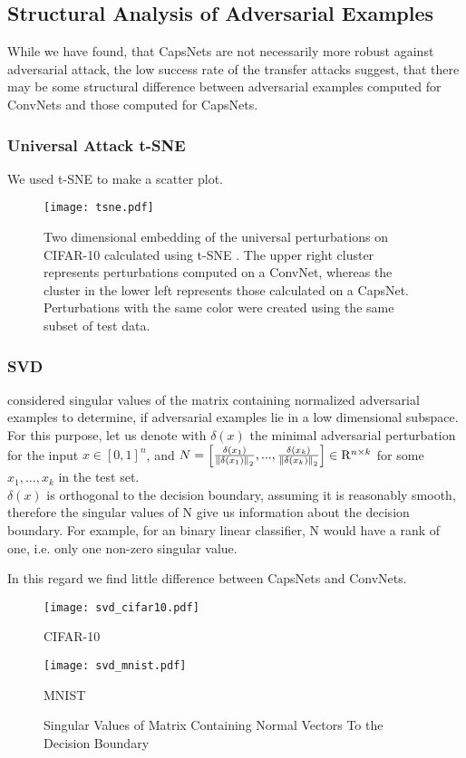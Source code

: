\subsection{Structural Analysis of Adversarial Examples}

While we have found, that CapsNets are not necessarily more robust against adversarial attack, the low success rate of the transfer attacks suggest, that there may be some structural difference between adversarial examples computed for ConvNets and those computed for CapsNets.

\subsubsection{Universal Attack t-SNE}

We used t-SNE \citep{tsne} to make a scatter plot.
\begin{figure}
	\texttt{[image: tsne.pdf]}
	\label{fig:tsne}
	\caption[t-SNE Plot of Universal Perturbations]{Two dimensional embedding of the universal perturbations on CIFAR-10 calculated using t-SNE \citep{tsne}. The upper right cluster represents perturbations computed on a ConvNet, whereas the cluster in the lower left represents those calculated on a CapsNet. Perturbations with the same color were created using the same subset of test data.}
\end{figure}




\subsubsection{SVD}
\citet{universal} considered singular values of the matrix containing normalized adversarial examples to determine, if adversarial examples lie in a low dimensional subspace. \\
For this purpose, let us denote with $\delta(x)$ the minimal adversarial perturbation for the input $x \in [0,1]^n$,
and $ N = \begin{bmatrix}
\frac{\delta(x_1)} {\left \lVert \delta(x_1) \right \rVert _2},  ...,  \frac{\delta(x_k)} {\left \lVert \delta(x_k) \right \rVert _2} 
\end{bmatrix}
\in \mathrm{R}^{n \times k}
$ for some $x_1, ..., x_k$ in the test set. \\
$\delta(x)$ is orthogonal to the decision boundary, assuming it is reasonably smooth, therefore the singular values of N give us information about the decision boundary. For example, for an binary linear classifier, N would have a rank of one, i.e. only one non-zero singular value.

In this regard we find little difference between CapsNets and ConvNets.

\begin{figure}
	\centering
	\texttt{[image: svd\_cifar10.pdf]}
	\caption{CIFAR-10}

	\texttt{[image: svd\_mnist.pdf]}
	\caption{MNIST}
	\caption{Singular Values of Matrix Containing Normal Vectors To the Decision Boundary}
	\label{fig:svd}
\end{figure}